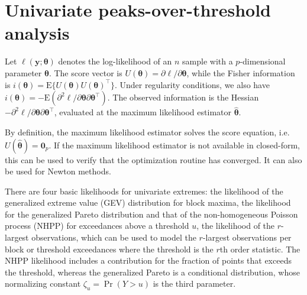 \documentclass[]{book}
\begin{document}
\newcommand{\bs}[1]{\boldsymbol{#1}}
\newcommand{\Hmat}{\mathbf{H}}
\newcommand{\Mmat}{\mathbf{M}}
\newcommand{\mX}{\mathbf{X}}
\newcommand{\bX}{{\mathbf{X}}}
\newcommand{\bx}{{\mathbf{x}}}
\newcommand{\by}{{\boldsymbol{y}}}
\newcommand{\bY}{{\boldsymbol{Y}}}
\newcommand{\eps}{\varepsilon}
\newcommand{\beps}{\boldsymbol{\varepsilon}}
\newcommand{\bbeta}{\boldsymbol{\beta}}
\newcommand{\hbb}{\hat{\boldsymbol{\beta}}}
\newcommand{\limni}{\lim_{n \ra \infty}}
\newcommand{\Sp}{\mathscr{S}}
\newcommand{\E}[2][]{{\mathsf E}_{#1}\left(#2\right)}
\newcommand{\Va}[2][]{{\mathsf{Var}_{#1}}\left(#2\right)}
\newcommand{\I}[1]{{\mathbf 1}_{#1}}
\newcommand{\R}{\mathbb{R}}
\newcommand{\N}{\mathbb{N}}
\newcommand{\Cn}{\textsf{No}}
\newcommand{\simiid}{\stackrel{\mathrm{iid}}{\sim}}
\newcommand{\bigO}{\mathrm{O}}
\newcommand{\rp}{\mathrm{p}}

\hypertarget{univariate-peaks-over-threshold-analysis}{%
\chapter{Univariate peaks-over-threshold analysis}\label{univariate-peaks-over-threshold-analysis}}

Let \(\ell(\boldsymbol{y}; \boldsymbol{\theta})\) denotes the log-likelihood of an \(n\) sample with a \(p\)-dimensional parameter \(\boldsymbol{\theta}\). The score vector is \(U(\boldsymbol{\theta})=\partial \ell / \partial \boldsymbol{\theta}\), while the Fisher information is \(i(\boldsymbol{\theta})=\mathrm{E}\{U(\boldsymbol{\theta})U(\boldsymbol{\theta})^\top\}\). Under regularity conditions, we also have \(i(\boldsymbol{\theta}) = - \mathrm{E}(\partial^2 \ell / \partial \boldsymbol{\theta}\partial \boldsymbol{\theta}^\top)\). The observed information is the Hessian \(-\partial^2 \ell / \partial \boldsymbol{\theta}\partial \boldsymbol{\theta}^\top\), evaluated at the maximum likelihood estimator \(\hat{\boldsymbol{\theta}}\).

By definition, the maximum likelihood estimator solves the score equation, i.e.~\(U(\hat{\boldsymbol{\theta}})=\boldsymbol{0}_p\). If the maximum likelihood estimator is not available in closed-form, this can be used to verify that the optimization routine has converged. It can also be used for Newton methods.

There are four basic likelihoods for univariate extremes: the likelihood of the generalized extreme value (GEV) distribution for block maxima, the likelihood for the generalized Pareto distribution and that of the non-homogeneous Poisson process (NHPP) for exceedances above a threshold \(u\), the likelihood of the \(r\)-largest observations, which can be used to model the \(r\)-largest observations per block or threshold exceedances where the threshold is the \(r\)th order statistic. The NHPP likelihood includes a contribution for the fraction of points that exceeds the threshold, whereas the generalized Pareto is a conditional distribution, whose normalizing constant \(\zeta_u=\Pr(Y>u)\) is the third parameter.
\end{document}
